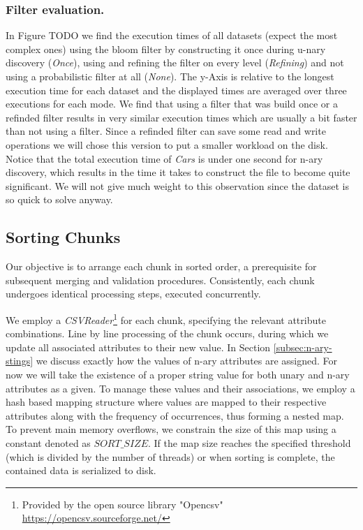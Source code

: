 \subsubsection{Filter evaluation.} In Figure TODO we find the execution times of all datasets (expect the most complex ones) using the bloom filter by constructing it once during u-nary discovery (\textit{Once}), using and refining the filter on every level (\textit{Refining}) and not using a probabilistic filter at all (\textit{None}). The y-Axis is relative to the longest execution time for each dataset and the displayed times are averaged over three executions for each mode. We find that using a filter that was build once or a refinded filter results in very similar execution times which are usually a bit faster than not using a filter. Since a refinded filter can save some read and write operations we will chose this version to put a smaller workload on the disk. Notice that the total execution time of \textit{Cars} is under one second for n-ary discovery, which results in the time it takes to construct the file to become quite significant. We will not give much weight to this observation since the dataset is so quick to solve anyway.


\subsection{Sorting Chunks}
Our objective is to arrange each chunk in sorted order, a prerequisite for subsequent merging and validation procedures. Consistently, each chunk undergoes identical processing steps, executed concurrently.

We employ a \textit{CSVReader}\footnote{Provided by the open source library "Opencsv" \url{https://opencsv.sourceforge.net/}} for each chunk, specifying the relevant attribute combinations. Line by line processing of the chunk occurs, during which we update all associated attributes to their new value. In Section \ref{subsec:n-ary-stings} we discuss exactly how the values of n-ary attributes are assigned. For now we will take the existence of a proper string value for both unary and n-ary attributes as a given. To manage these values and their associations, we employ a hash based mapping structure where values are mapped to their respective attributes along with the frequency of occurrences, thus forming a nested map. To prevent main memory overflows, we constrain the size of this map using a constant denoted as $SORT\_SIZE$. If the map size reaches the specified threshold (which is divided by the number of threads) or when sorting is complete, the contained data is serialized to disk.

